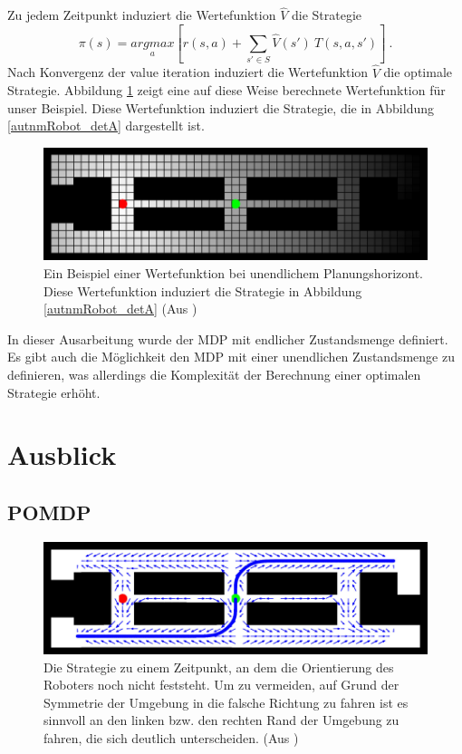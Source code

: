 \documentclass[a4paper]{IEEEtran}
\begin{document}
Zu jedem Zeitpunkt induziert die Wertefunktion $\hat{V}$ die Strategie
\begin{equation}
	\pi(s) = \underset{a}{argmax} \left[ r(s,a) + \sum_{s' \in S} \hat{V}(s')\ T(s, a, s') \right]\ .
\end{equation}
Nach Konvergenz der value iteration induziert die Wertefunktion $\hat{V}$ die optimale Strategie.
Abbildung \ref{autnmRobot_policy} zeigt eine auf diese Weise berechnete Wertefunktion für unser Beispiel. Diese Wertefunktion induziert die Strategie, die in Abbildung \ref{autnmRobot_detA} dargestellt ist.
\begin{figure}[ht]
	\centering
	\includegraphics[scale=0.72]{images/autnmRobot_MDPValueFunction.png}
	\caption{Ein Beispiel einer Wertefunktion bei unendlichem Planungshorizont. Diese Wertefunktion induziert die Strategie in Abbildung \ref{autnmRobot_detA} (Aus \cite{thrun2005probabilistic})}
	\label{autnmRobot_policy}
\end{figure}

In dieser Ausarbeitung wurde der MDP mit endlicher Zustandsmenge definiert. Es gibt auch die Möglichkeit den MDP mit einer unendlichen Zustandsmenge zu definieren, was allerdings die Komplexität der Berechnung einer optimalen Strategie erhöht. 


\section{Ausblick}
\label{sec:pomdp}
\subsection{POMDP}
\begin{figure}[ht]
	\centering
	\includegraphics[scale=0.72]{images/autnmRobot_POMDPPathA.png}
	\caption{Die Strategie zu einem Zeitpunkt, an dem die Orientierung des Roboters noch nicht feststeht. Um zu vermeiden, auf Grund der Symmetrie der Umgebung in die falsche Richtung zu fahren ist es sinnvoll an den linken bzw. den rechten Rand der Umgebung zu fahren, die sich deutlich unterscheiden. (Aus \cite{thrun2005probabilistic})}
	\label{autnmRobot_POMDPPathA}
\end{figure}
\end{document}
